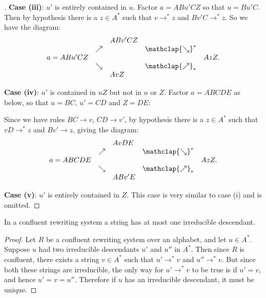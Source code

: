 \documentclass[showlabels,noindex,12pt]{lmaths}
\newcommand{\nearrowstar}{\mathclap{\nearrow}_{*}}
\newcommand{\searrowstar}{\mathclap{\searrow}^{*}}
\begin{document}
\begin{proof}[ ]
	\textbf{Case (iii)}: $u'$ is entirely contained in $u$. Factor $a = ABu'CZ$ so that $u = Bu'C$. Then by hypothesis there is a $z \in A^*$ such that $v \to^* z$ and $Bv'C \to^* z$. So we have the diagram: \[
		\begin{array}{lllll}
			& & ABv'CZ & & \\
			& \nearrow & & \searrowstar & \\
			a = ABu'CZ & & & & AzZ. \\
			& \searrow & & \nearrowstar & \\
			& & AvZ & &
		\end{array}
	\]

	\textbf{Case (iv)}: $u'$ is contained in $uZ$ but not in $u$ or $Z$. Factor $a = ABCDE$ as below, so that $u = BC$, $u' = CD$ and $Z = DE$:

	{\centering
	\par}

	Since we have rules $BC \to v$, $CD \to v'$, by hypothesis there is a $z \in A^*$ such that $vD \to^* z$ and $Bv' \to z$, giving the diagram: \[
		\begin{array}{lllll}
			& & AvDE & & \\
			& \nearrow & & \searrowstar & \\
			a = ABCDE & & & & AzZ. \\
			& \searrow & & \nearrowstar & \\
			& & ABv'E & &
		\end{array}
	\]

	\textbf{Case (v)}: $u'$ is entirely contained in $Z$. This case is very similar to case (i) and is omitted.
\end{proof}

\begin{prop}
	In a confluent rewriting system a string has at most one irreducible descendant. \label{prop:confluent-at-most-one}
\end{prop}
\begin{proof}
	Let $R$ be a confluent rewriting system over an alphabet, and let $u \in A^*$. Suppose $u$ had two irreducible descendants $u'$ and $u''$ in $A^*$. Then since $R$ is confluent, there exists a string $v \in A^*$ such that $u' \to^* v$ and $u'' \to^* v$. But since both these strings are irreducible, the only way for $u' \to^* v$ to be true is if $u' = v$, and hence $u' = v = u''$. Therefore if $u$ has an irreducible descendant, it must be unique.
\end{proof}
\end{document}
